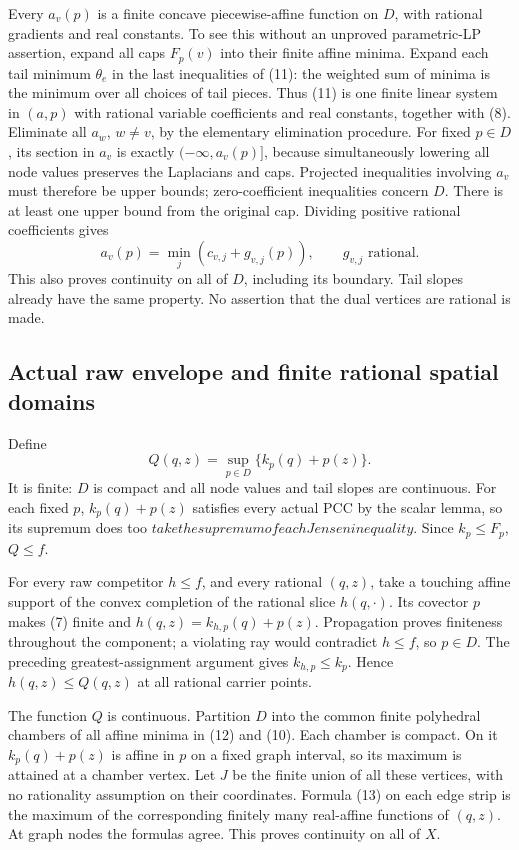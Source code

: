 \documentclass[
  11pt,
]{article}
\begin{document}
Every \(a_v(p)\) is a finite concave piecewise-affine function on \(D\),
with rational gradients and real constants. To see this without an
unproved parametric-LP assertion, expand all caps \(F_p(v)\) into their
finite affine minima. Expand each tail minimum \(\theta_e\) in the last
inequalities of (11): the weighted sum of minima is the minimum over all
choices of tail pieces. Thus (11) is one finite linear system in
\((a,p)\) with rational variable coefficients and real constants,
together with (8). Eliminate all \(a_w\), \(w\ne v\), by the elementary
elimination procedure. For fixed \(p\in D\), its section in \(a_v\) is
exactly \((-\infty,a_v(p)]\), because simultaneously lowering all node
values preserves the Laplacians and caps. Projected inequalities
involving \(a_v\) must therefore be upper bounds; zero-coefficient
inequalities concern \(D\). There is at least one upper bound from the
original cap. Dividing positive rational coefficients gives \[
 a_v(p)=\min_j(c_{v,j}+g_{v,j}(p)),\qquad g_{v,j}\text{ rational}.             \tag{12}
\] This also proves continuity on all of \(D\), including its boundary.
Tail slopes already have the same property. No assertion that the dual
vertices are rational is made.

\subsection{Actual raw envelope and finite rational spatial
domains}\label{actual-raw-envelope-and-finite-rational-spatial-domains}

Define \[
 Q(q,z)=\sup_{p\in D}\{k_p(q)+p(z)\}.                                    \tag{13}
\] It is finite: \(D\) is compact and all node values and tail slopes
are continuous. For each fixed \(p\), \(k_p(q)+p(z)\) satisfies every
actual PCC by the scalar lemma, so its supremum does too
\(take the supremum of each Jensen inequality\). Since \(k_p\leq F_p\),
\(Q\leq f\).

For every raw competitor \(h\leq f\), and every rational \((q,z)\), take
a touching affine support of the convex completion of the rational slice
\(h(q,\cdot)\). Its covector \(p\) makes (7) finite and
\(h(q,z)=k_{h,p}(q)+p(z)\). Propagation proves finiteness throughout the
component; a violating ray would contradict \(h\leq f\), so \(p\in D\).
The preceding greatest-assignment argument gives \(k_{h,p}\leq k_p\).
Hence \(h(q,z)\leq Q(q,z)\) at all rational carrier points.

The function \(Q\) is continuous. Partition \(D\) into the common finite
polyhedral chambers of all affine minima in (12) and (10). Each chamber
is compact. On it \(k_p(q)+p(z)\) is affine in \(p\) on a fixed graph
interval, so its maximum is attained at a chamber vertex. Let \(J\) be
the finite union of all these vertices, with no rationality assumption
on their coordinates. Formula (13) on each edge strip is the maximum of
the corresponding finitely many real-affine functions of \((q,z)\). At
graph nodes the formulas agree. This proves continuity on all of \(X\).
\end{document}

